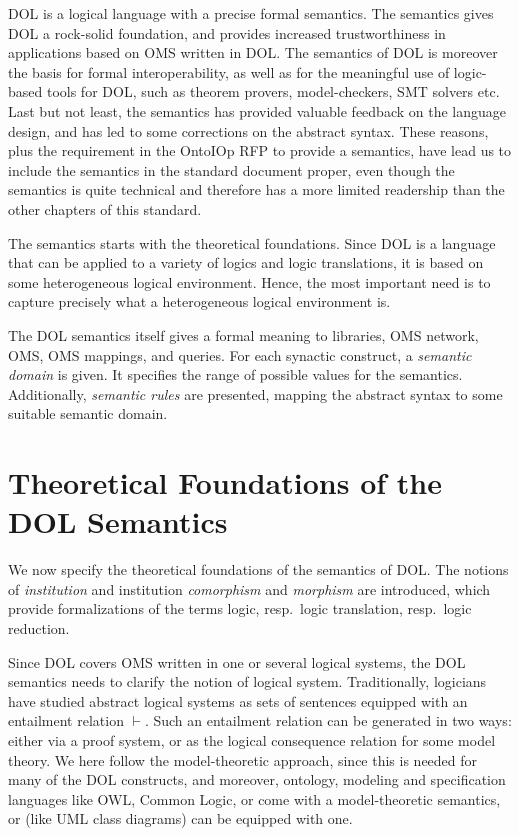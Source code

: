 \documentclass[10pt,fleqn,%
\ifpretendfinal
final%
\else
draft%
\fi,
]{scrreprt}
\newcommand*{\termref}[1]{\index{#1}#1\xspace}
\newcommand{\sclause}[1]{\section{#1}}
\begin{document}
DOL is a logical language with a precise formal semantics.  The
semantics gives DOL a rock-solid foundation, and provides increased
trustworthiness in applications based on OMS written in DOL.  The
semantics of DOL is moreover the basis for formal interoperability, as
well as for the meaningful use of logic-based tools for DOL, such as
theorem provers, model-checkers, SMT solvers etc.  Last but not least,
the semantics has provided valuable feedback on the language design,
and has led to some corrections on the abstract syntax.  These
reasons, plus the requirement in the OntoIOp RFP to provide a
semantics, have lead us to include the semantics in the standard
document proper, even though the semantics is quite technical and
therefore has a more limited readership than the other chapters of
this standard.

The semantics starts with the theoretical foundations. Since DOL is a
language that can be applied to a variety of logics and logic
translations, it is based on some heterogeneous logical environment.
Hence, the most important need is to capture precisely what a
heterogeneous logical environment is.

The DOL semantics itself gives a formal meaning to libraries, OMS
network, OMS, OMS mappings, and queries. For each synactic construct,
a \emph{semantic domain} is given. It specifies the range of possible
values for the semantics. Additionally, \emph{semantic rules} are
presented, mapping the abstract syntax to some suitable semantic
domain.

\sclause{Theoretical Foundations of the DOL Semantics}

We now specify the theoretical foundations of the semantics of DOL.
The notions of \emph{institution} and institution 
\emph{comorphism} and \emph{morphism} are introduced, which provide formalizations of the terms 
\termref{logic}, resp.\ \termref{logic translation}, resp.\  \termref{logic reduction}. 

Since DOL covers OMS written in one or several logical systems, the
DOL semantics needs to clarify the notion of logical
system. Traditionally, logicians have studied abstract logical systems
as sets of sentences equipped with an entailment relation
$\vdash$. Such an entailment relation can be generated in two ways:
either via a proof system, or as the logical consequence relation for
some model theory.  We here follow the model-theoretic approach, since
this is needed for many of the DOL constructs, and moreover, ontology,
modeling and specification languages like OWL, Common Logic, or \CASL
come with a model-theoretic semantics, or (like UML class diagrams)
can be equipped with one.
\end{document}
